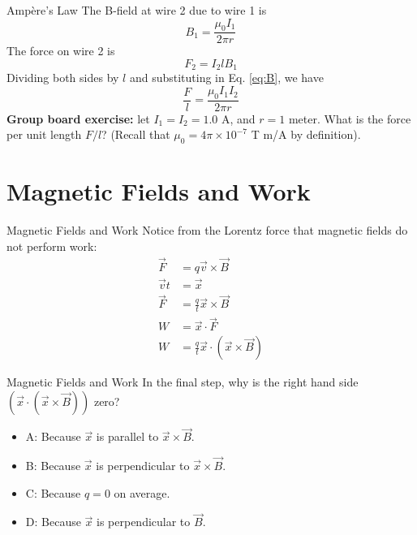 \documentclass{beamer}
\begin{document}
\begin{frame}{Amp\`{e}re's Law}
The B-field at wire 2 due to wire 1 is
\begin{equation}
B_1 = \frac{\mu_0 I_1}{2\pi r}
\label{eq:B}
\end{equation}
The force on wire 2 is 
\begin{equation}
F_2 = I_2 l B_1
\end{equation}
Dividing both sides by $l$ and substituting in Eq. \ref{eq:B}, we have
\begin{equation}
\frac{F}{l} = \frac{\mu_0 I_1 I_2}{2\pi r}
\end{equation}
\textbf{Group board exercise:} let $I_1 = I_2 = 1.0$ A, and $r = 1$ meter.  What is the force per unit length $F/l$?  (Recall that $\mu_0 = 4\pi \times 10^{-7}$ T m/A by definition).
\end{frame}

\section{Magnetic Fields and Work}

\begin{frame}{Magnetic Fields and Work}
Notice from the Lorentz force that magnetic fields do not perform work:
\begin{align}
\vec{F} &= q \vec{v} \times \vec{B} \\ 
\vec{v} t &= \vec{x} \\
\vec{F} &= \frac{q}{t} \vec{x} \times \vec{B} \\
W &= \vec{x} \cdot \vec{F} \\
W &= \frac{q}{t} \vec{x} \cdot \left( \vec{x} \times \vec{B} \right)
\end{align}
\end{frame}

\begin{frame}{Magnetic Fields and Work}
In the final step, why is the right hand side $\left(\vec{x} \cdot \left( \vec{x} \times \vec{B} \right) \right)$ zero?
\begin{itemize}
\item A: Because $\vec{x}$ is parallel to $\vec{x} \times \vec{B}$.
\item B: Because $\vec{x}$ is perpendicular to $\vec{x} \times \vec{B}$.
\item C: Because $q = 0$ on average.
\item D: Because $\vec{x}$ is perpendicular to $\vec{B}$.
\end{itemize}
\end{frame}
\end{document}
